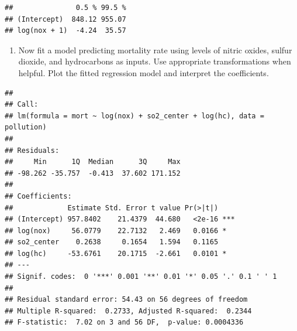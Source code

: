 \documentclass[]{article}
\newenvironment{Shaded}{\begin{snugshade}}{\end{snugshade}}
\newcommand{\KeywordTok}[1]{\textcolor[rgb]{0.13,0.29,0.53}{\textbf{#1}}}
\newcommand{\DataTypeTok}[1]{\textcolor[rgb]{0.13,0.29,0.53}{#1}}
\newcommand{\CommentTok}[1]{\textcolor[rgb]{0.56,0.35,0.01}{\textit{#1}}}
\newcommand{\OperatorTok}[1]{\textcolor[rgb]{0.81,0.36,0.00}{\textbf{#1}}}
\newcommand{\NormalTok}[1]{#1}
\providecommand{\tightlist}{%
  \setlength{\itemsep}{0pt}\setlength{\parskip}{0pt}}
\begin{document}
\begin{verbatim}
##               0.5 % 99.5 %
## (Intercept)  848.12 955.07
## log(nox + 1)  -4.24  35.57
\end{verbatim}

\begin{Shaded}
\end{Shaded}

\begin{enumerate}
\def\labelenumi{\arabic{enumi}.}
\setcounter{enumi}{4}
\tightlist
\item
  Now fit a model predicting mortality rate using levels of nitric
  oxides, sulfur dioxide, and hydrocarbons as inputs. Use appropriate
  transformations when helpful. Plot the fitted regression model and
  interpret the coefficients.
\end{enumerate}

\begin{Shaded}
\end{Shaded}

\begin{verbatim}
## 
## Call:
## lm(formula = mort ~ log(nox) + so2_center + log(hc), data = pollution)
## 
## Residuals:
##     Min      1Q  Median      3Q     Max 
## -98.262 -35.757  -0.413  37.602 171.152 
## 
## Coefficients:
##             Estimate Std. Error t value Pr(>|t|)    
## (Intercept) 957.8402    21.4379  44.680   <2e-16 ***
## log(nox)     56.0779    22.7132   2.469   0.0166 *  
## so2_center    0.2638     0.1654   1.594   0.1165    
## log(hc)     -53.6761    20.1715  -2.661   0.0101 *  
## ---
## Signif. codes:  0 '***' 0.001 '**' 0.01 '*' 0.05 '.' 0.1 ' ' 1
## 
## Residual standard error: 54.43 on 56 degrees of freedom
## Multiple R-squared:  0.2733, Adjusted R-squared:  0.2344 
## F-statistic:  7.02 on 3 and 56 DF,  p-value: 0.0004336
\end{verbatim}
\end{document}
